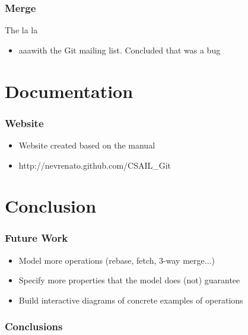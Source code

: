 \documentclass{beamer}
\begin{document}
\begin{frame}[fragile]
	\frametitle{Merge}
	\begin{block}{The la la} 
	\begin{itemize}
		\item aaawith the Git mailing list. Concluded that was a bug
	\end{itemize}
	\end{block}
\end{frame}

\section{Documentation}

\begin{frame}
	\frametitle{Website}
	\begin{itemize}
	\item Website created based on the manual 
	\item http://nevrenato.github.com/CSAIL\_Git
	\end{itemize}

\end{frame}

\section{Conclusion}

\begin{frame}
	\frametitle{Future Work}
	\begin{itemize}
	\item Model more operations (rebase, fetch, 3-way merge...) 
	\item Specify more properties that the model does (not) guarantee
	\item Build interactive diagrams of concrete examples of operations 
	\end{itemize}
\end{frame}

\begin{frame}
	\frametitle{Conclusions}
\end{frame}
\end{document}
